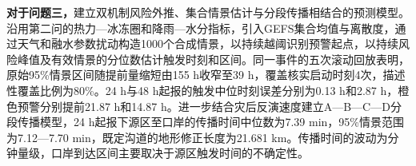 
\textbf{对于问题三，}建立双机制风险外推、集合情景估计与分段传播相结合的预测模型。沿用第二问的热力—冰冻圈和降雨—水分指标，引入GEFS集合均值与离散度，通过天气和融水参数扰动构造1000个合成情景，以持续越阈识别预警起点，以持续风险峰值及有效情景的分位数估计触发时刻和区间。同一事件的五次滚动回放表明，原始95\%情景区间随提前量缩短由155 h收窄至39 h，覆盖核实启动时刻4次，描述性覆盖比例为80\%。24 h与48 h起报的触发中位时刻误差分别为0.13 h和2.87 h，橙色预警分别提前21.87 h和14.87 h。进一步结合灾后反演速度建立A—B—C—D分段传播模型，24 h起报下源区至口岸的传播时间中位数为7.39 min，95\%情景范围为7.12—7.70 min，既定沟道的地形修正长度为21.681 km。传播时间的波动为分钟量级，口岸到达区间主要取决于源区触发时间的不确定性。
\par
